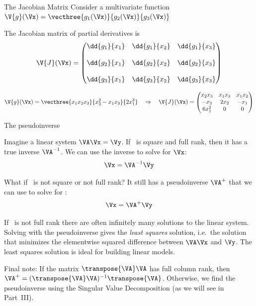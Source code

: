 \documentclass[9pt]{beamer}
\begin{document}
\begin{frame}{The Jacobian Matrix}
Consider a multivariate function $\V{g}(\Vx) = \vecthree{g_1(\Vx)}{g_2(\Vx)}{g_3(\Vx)}$

\medskip
The Jacobian matrix of partial derivatives is
\[ \V{J}(\Vx) = \begin{pmatrix} 
	\dd{g_1}{x_1} & \dd{g_1}{x_2} & \dd{g_1}{x_3} \\ \\
 	\dd{g_2}{x_1} & \dd{g_2}{x_2} & \dd{g_2}{x_3} \\ \\
 	\dd{g_3}{x_1} & \dd{g_3}{x_2} & \dd{g_3}{x_3} \\
 \end{pmatrix} \]

\pause
\[ \V{g}(\Vx) = \vecthree{x_1x_2x_3}{x_2^2-x_1x_3}{2x_1^3} \quad \Rightarrow \quad \V{J}(\Vx) = \begin{pmatrix}
 	x_2x_3 & x_1x_3 & x_1x_2 \\
 	-x_3 & 2x_2 & -x_1 \\
 	6x_1^2 & 0 & 0	
 \end{pmatrix} \]

\end{frame}

\begin{frame}{The pseudoinverse}

Imagine a linear system $\VA\Vx = \Vy$. If \VA\ is square and full rank, then it has a true inverse $\VA^{-1}$. We can use the inverse to solve for $\Vx$:
\[ \Vx = \VA^{-1}\Vy \]

\pause
What if \VA\ is not square or not full rank? It still has a pseudoinverse $\VA^+$ that we can use to solve for \Vx:
\[ \Vx = \VA^+\Vy \]

\pause
If \VA\ is not full rank there are often infinitely many solutions to the linear system. Solving with the pseudoinverse gives the \emph{least squares} solution, i.e.\ the solution that minimizes the elementwise squared difference between $\VA\Vx$ and $\Vy$. The least squares solution is ideal for building linear models.

\pause
\bigskip
Final note: If the matrix $\transpose{\VA}\VA$ has full column rank, then $\VA^+ = (\transpose{\VA}\VA)^{-1}\transpose{\VA}$. Otherwise, we find the pseudoinverse using the Singular Value Decomposition (as we will see in Part~III).
\end{frame}
\end{document}
